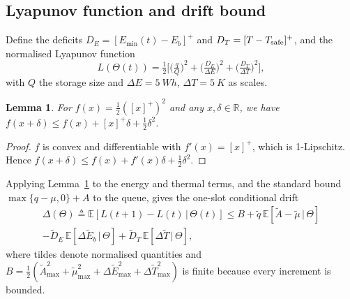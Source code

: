 \documentclass[conference]{IEEEtran}
\newtheorem{lemma}{Lemma}
\theoremstyle{remark}
\begin{document}
\subsection{Lyapunov function and drift bound}
Define the deficits $D_E=[E_{\min}(t)-E_b]^+$ and $D_T=[T-T_{\rm safe}]^+$, and the normalised Lyapunov function
\begin{equation}
L(\Theta(t))=\tfrac12\Big[\big(\tfrac{q}{Q}\big)^2+\big(\tfrac{D_E}{\Delta E}\big)^2+\big(\tfrac{D_T}{\Delta T}\big)^2\Big],\label{eq:lyap}
\end{equation}
with $Q$ the storage size and $\Delta E=\SI{5}{Wh}$, $\Delta T=\SI{5}{K}$ as scales.

\begin{lemma}\label{lem:plus}
For $f(x)=\tfrac12([x]^+)^2$ and any $x,\delta\in\mathbb R$, we have $f(x+\delta)\le f(x)+[x]^+\delta+\tfrac12\delta^2$.
\end{lemma}
\begin{proof}
$f$ is convex and differentiable with $f'(x)=[x]^+$, which is 1-Lipschitz. Hence $f(x+\delta)\le f(x)+f'(x)\delta+\tfrac12\delta^2$.
\end{proof}

Applying Lemma~\ref{lem:plus} to the energy and thermal terms, and the standard bound $\max\{q-\mu,0\}+A$ to the queue, gives the one-slot conditional drift
\begin{multline}
\Delta(\Theta)\triangleq\mathbb E[L(t{+}1)-L(t)\,|\,\Theta(t)]\le B+\tilde q\,\mathbb E[\tilde A-\tilde\mu\,|\,\Theta]\\
-\tilde D_E\,\mathbb E[\Delta\tilde E_b\,|\,\Theta]+\tilde D_T\,\mathbb E[\Delta\tilde T\,|\,\Theta],\label{eq:drift}
\end{multline}
where tildes denote normalised quantities and $B=\tfrac12(\tilde A_{\max}^2+\tilde\mu_{\max}^2+\Delta\tilde E_{\max}^2+\Delta\tilde T_{\max}^2)$ is finite because every increment is bounded.
\end{document}
